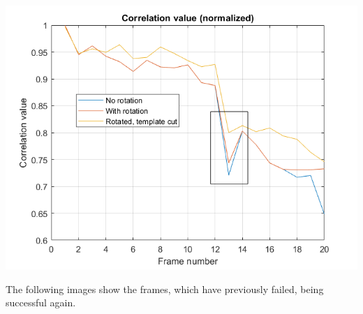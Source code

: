 \documentclass[a4paper]{iacas}
\begin{document}
\begin{enumerate}
\vskip 0.1in
\begin{minipage}{0.5\textwidth}
\centering
	\includegraphics[scale=0.8]{output/q4/algo_3/algo_3_13_frame.png}
\end{minipage}
\vskip 0.1in

\end{enumerate}


The following images show the frames, which have previously failed, being successful again.
\end{document}
